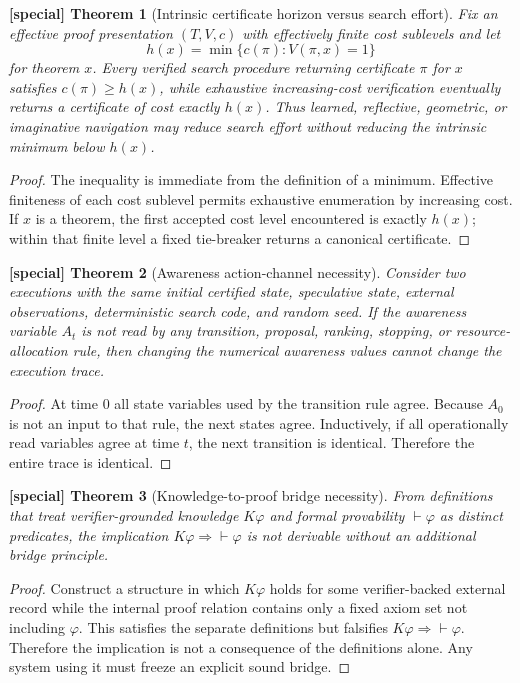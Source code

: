 \documentclass[11pt]{article}
\theoremstyle{special}
\newtheorem{specialthm}{[special] Theorem}[section]
\theoremstyle{definition}
\begin{document}
\begin{specialthm}[Intrinsic certificate horizon versus search effort]
Fix an effective proof presentation $(T,V,c)$ with effectively finite cost sublevels and let
\[
h(x)=\min\{c(\pi):V(\pi,x)=1\}
\]
for theorem $x$. Every verified search procedure returning certificate $\pi$ for $x$ satisfies $c(\pi)\ge h(x)$, while exhaustive increasing-cost verification eventually returns a certificate of cost exactly $h(x)$. Thus learned, reflective, geometric, or imaginative navigation may reduce search effort without reducing the intrinsic minimum below $h(x)$.
\end{specialthm}
\begin{proof}
The inequality is immediate from the definition of a minimum. Effective finiteness of each cost sublevel permits exhaustive enumeration by increasing cost. If $x$ is a theorem, the first accepted cost level encountered is exactly $h(x)$; within that finite level a fixed tie-breaker returns a canonical certificate.\qedhere
\end{proof}

\begin{specialthm}[Awareness action-channel necessity]
Consider two executions with the same initial certified state, speculative state, external observations, deterministic search code, and random seed. If the awareness variable $A_t$ is not read by any transition, proposal, ranking, stopping, or resource-allocation rule, then changing the numerical awareness values cannot change the execution trace.
\end{specialthm}
\begin{proof}
At time $0$ all state variables used by the transition rule agree. Because $A_0$ is not an input to that rule, the next states agree. Inductively, if all operationally read variables agree at time $t$, the next transition is identical. Therefore the entire trace is identical.\qedhere
\end{proof}

\begin{specialthm}[Knowledge-to-proof bridge necessity]
From definitions that treat verifier-grounded knowledge $K\varphi$ and formal provability $\vdash\varphi$ as distinct predicates, the implication $K\varphi\Rightarrow\vdash\varphi$ is not derivable without an additional bridge principle.
\end{specialthm}
\begin{proof}
Construct a structure in which $K\varphi$ holds for some verifier-backed external record while the internal proof relation contains only a fixed axiom set not including $\varphi$. This satisfies the separate definitions but falsifies $K\varphi\Rightarrow\vdash\varphi$. Therefore the implication is not a consequence of the definitions alone. Any system using it must freeze an explicit sound bridge.\qedhere
\end{proof}
\end{document}
